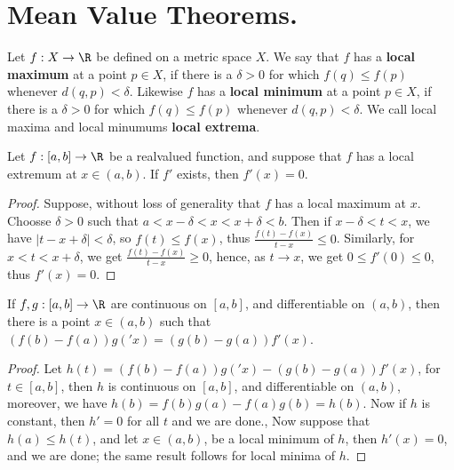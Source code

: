 
\section{Mean Value Theorems.}

\begin{definition}
    Let $f:X \rightarrow \R$ be defined on a metric space $X$. We say that  $f$ has a 
    \textbf{local maximum} at a point  $p \in X$, if  there is a $\delta>0$ for which  $f(q) \leq f(p)$ 
    whenever  $d(q,p)<\delta$. Likewise $f$ has a \textbf{local minimum} at a point  $p \in X$, 
    if  there is a $\delta>0$ for which  $f(q) \leq f(p)$ whenever  $d(q,p)<\delta$. We call 
    local maxima and local minumums \textbf{local extrema}.
\end{definition}

\begin{theorem}\label{6.2.1}
    Let $f:[a,b] \rightarrow \R$ be a realvalued function, and suppose that  $f$ has a local 
    extremum at  $x \in (a,b)$. If $f'$ exists, then  $f'(x)=0$.
\end{theorem}
\begin{proof}
    Suppose, without loss of generality that $f$ has a local maximum at  $x$. Choosse  $\delta>0$ 
    such that $a<x-\delta<x<x+\delta<b$. Then if  $x-\delta<t<x$, we have  $|t-x+\delta|<\delta$, so  $f(t) \leq f(x)$, 
    thus  $\frac{f(t)-f(x)}{t-x} \leq 0$. Similarly, for $x<t<x+\delta$, we get $\frac{f(t)-f(x)}{t-x} \geq 0$, 
    hence, as $t \rightarrow x$, we get  $0 \leq f'(0) \leq 0$, thus  $f'(x)=0$.
\end{proof}

\begin{theorem}\label{6.2.2}
    If $f,g:[a,b] \rightarrow \R$ are continuous on  $[a,b]$, and differentiable on  $(a,b)$, then 
    there is a point  $x \in (a,b)$ such that $(f(b)-f(a))g('x)=(g(b)-g(a))f'(x)$.
\end{theorem}
\begin{proof}
    Let $h(t)=(f(b)-f(a))g('x)-(g(b)-g(a))f'(x)$, for $t \in [a,b]$, then $h$ is continuous on 
    $[a,b]$, and differentiable on  $(a,b)$, moreover, we have  $h(b)=f(b)g(a)-f(a)g(b)=h(b)$. Now 
    if  $h$ is constant, then $h'=0$ for all  $t$ and we are done., Now suppose that  $h(a) \leq h(t)$, 
    and let  $x \in (a,b)$, be a local minimum of $h$, then  $h'(x)=0$, and we are done; the same 
    result follows for local minima of  $h$.
\end{proof}

